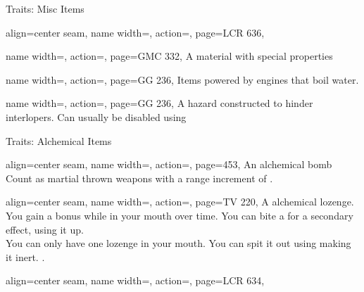 \begin{PageFront}
\begin{Tables}{\frontTableHeight}
\begin{Table}{Traits: Misc Items}
\begin{entry}{}{%
                align=center seam,
                name width=\conditionLength,%
                action=\Snare,
                page=LCR 636,
            }
            \end{entry}
            \begin{entry}{}{%
                name width=\conditionLength,%
                action=\Precious,
                page=GMC 332,
            }
                A material with special properties
            \end{entry}
            \begin{entry}{}{%
                name width=\conditionLength,%
                action=\Steam,
                page=GG 236,
            }
                Items powered by engines that boil water.
            \end{entry}
            \begin{entry}{}{%
                name width=\conditionLength,%
                action=\Trap,
                page=GG 236,
            }
                A hazard constructed to hinder interlopers.\hfill
                Can usually be disabled using 
            \end{entry}
        \end{Table}\TableSpace
        \begin{Table}{Traits: Alchemical Items}
            \begin{entry}{}{%
                align=center seam,
                name width=\conditionLength,%
                action=\Bomb,
                page=453,
            }
                An alchemical bomb \hfill {} \\
                Count as martial thrown weapons with a range increment of  \Feet.\hfill
            \end{entry}
            \begin{entry}{}{%
                align=center seam,
                name width=\conditionLength,%
                action=\Lozenge,
                page=TV 220,
            }
                A alchemical lozenge. You gain a bonus while in your mouth over time. \hfill
                You can bite a for a secondary effect, using it up.\\
                You can only have one lozenge in your mouth.
                You can spit it out using  making it inert.\hfill
                .
            \end{entry}
            \begin{entry}{}{%
                align=center seam,
                name width=\conditionLength,%
                action=\Mutagen,
                page=LCR 634,
            }

\end{entry}
\end{Table}
\end{Tables}
\end{PageFront}
